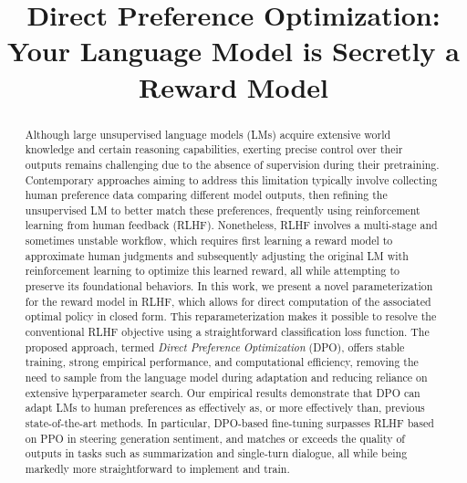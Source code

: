 \title{Direct Preference Optimization: Your Language Model is Secretly a Reward Model}

\begin{abstract}
Although large unsupervised language models (LMs) acquire extensive world knowledge and certain reasoning capabilities, exerting precise control over their outputs remains challenging due to the absence of supervision during their pretraining. Contemporary approaches aiming to address this limitation typically involve collecting human preference data comparing different model outputs, then refining the unsupervised LM to better match these preferences, frequently using reinforcement learning from human feedback (RLHF). Nonetheless, RLHF involves a multi-stage and sometimes unstable workflow, which requires first learning a reward model to approximate human judgments and subsequently adjusting the original LM with reinforcement learning to optimize this learned reward, all while attempting to preserve its foundational behaviors. In this work, we present a novel parameterization for the reward model in RLHF, which allows for direct computation of the associated optimal policy in closed form. This reparameterization makes it possible to resolve the conventional RLHF objective using a straightforward classification loss function. The proposed approach, termed \textit{Direct Preference Optimization} (DPO), offers stable training, strong empirical performance, and computational efficiency, removing the need to sample from the language model during adaptation and reducing reliance on extensive hyperparameter search. Our empirical results demonstrate that DPO can adapt LMs to human preferences as effectively as, or more effectively than, previous state-of-the-art methods. In particular, DPO-based fine-tuning surpasses RLHF based on PPO in steering generation sentiment, and matches or exceeds the quality of outputs in tasks such as summarization and single-turn dialogue, all while being markedly more straightforward to implement and train.
\end{abstract}

